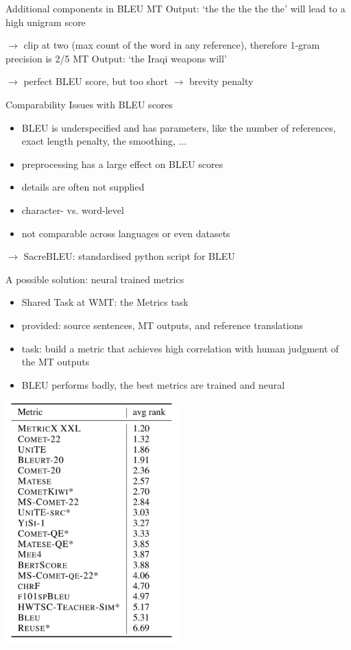 \begin{vbframe}{Additional components in BLEU}
	MT Output: `the the the the the' will lead to a high unigram score 
	
	$\rightarrow$ clip at two (max count of the word in any reference), therefore 1-gram precision is 2/5
	\vfill
	MT Output: `the Iraqi weapons will' 
	
	$\rightarrow$ perfect BLEU score, but too short $\rightarrow$ brevity penalty
\end{vbframe}

\begin{vbframe}{Comparability Issues with BLEU scores}
	\vfill
	\begin{itemize}
		\item BLEU is underspecified and has parameters, like the number of references, exact length penalty, the smoothing, ...
		\item preprocessing has a large effect on BLEU scores
		\item details are often not supplied
		\item character- vs. word-level
		\item not comparable across languages or even datasets
	\end{itemize}
	\vfill
	$\rightarrow$ SacreBLEU: standardised python script for BLEU
\end{vbframe}

\begin{vbframe}{A possible solution: neural trained metrics}
	\vfill
	\begin{itemize}
		\item Shared Task at WMT: the Metrics task
		\item provided: source sentences, MT outputs, and reference translations
		\item task: build a metric that achieves high correlation with human judgment of the MT outputs
		\item BLEU performs badly, the best metrics are trained and neural
	\end{itemize}
	\includegraphics[width=0.5\textwidth]{evaluation_figures/neural_empty.png}
\end{vbframe}

